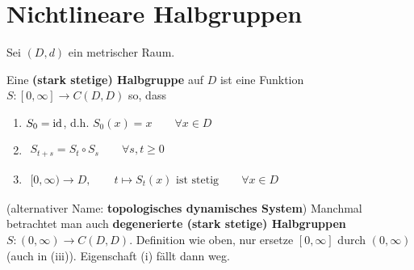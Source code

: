 
\chapter{Nichtlineare Halbgruppen} %
\setcounter{section}{1}
Sei $(D,d)$ ein metrischer Raum.

\begin{definition}
	Eine \textbf{(stark stetige) Halbgruppe} auf $D$ ist eine Funktion\\ $S:[0,\infty]\to C(D,D)$ so, dass 
	\begin{enumerate}[label=(\roman*)]
		\item $S_0=\operatorname{id}$, d.h. $S_0(x)=x\qquad\forall x\in D$
		\item $\begin{aligned}
			S_{t+s}=S_t\circ S_s\qquad\forall s,t\geq0
		\end{aligned}$
		\item $\begin{aligned}
			[0,\infty)\to D,\qquad t\mapsto S_t(x)\text{ ist stetig}\qquad\forall x\in D
		\end{aligned}$
	\end{enumerate}
	(alternativer Name: \textbf{topologisches dynamisches System})\nl
	Manchmal betrachtet man auch \textbf{degenerierte (stark stetige) Halbgruppen}\\ $S\colon (0,\infty)\to C(D,D)$. 
	Definition wie oben, nur ersetze $[0,\infty]$ durch $(0,\infty)$ (auch in (iii)). Eigenschaft (i) fällt dann weg.
\end{definition}

